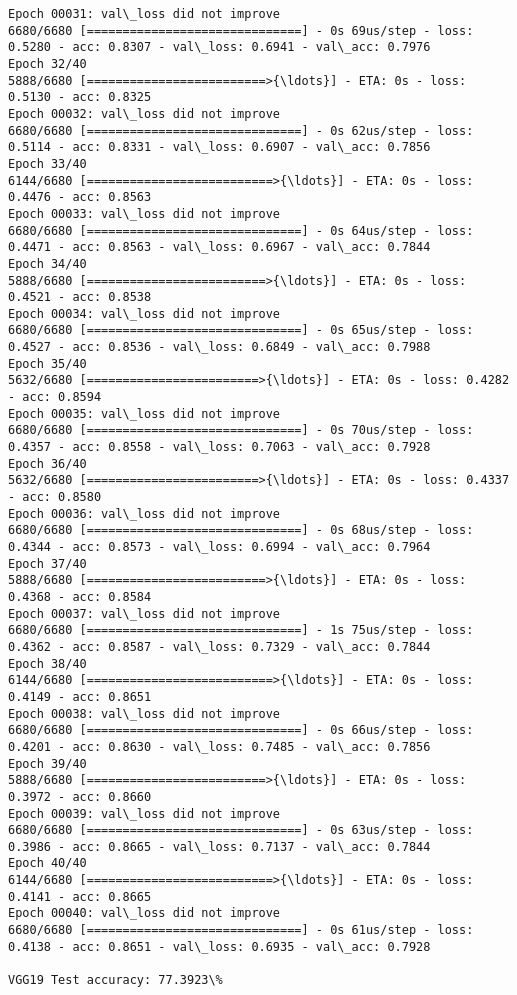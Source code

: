 \documentclass[11pt]{article}
\begin{document}
\begin{Verbatim}[commandchars=\\\{\}]
Epoch 00031: val\_loss did not improve
6680/6680 [==============================] - 0s 69us/step - loss: 0.5280 - acc: 0.8307 - val\_loss: 0.6941 - val\_acc: 0.7976
Epoch 32/40
5888/6680 [=========================>{\ldots}] - ETA: 0s - loss: 0.5130 - acc: 0.8325
Epoch 00032: val\_loss did not improve
6680/6680 [==============================] - 0s 62us/step - loss: 0.5114 - acc: 0.8331 - val\_loss: 0.6907 - val\_acc: 0.7856
Epoch 33/40
6144/6680 [==========================>{\ldots}] - ETA: 0s - loss: 0.4476 - acc: 0.8563
Epoch 00033: val\_loss did not improve
6680/6680 [==============================] - 0s 64us/step - loss: 0.4471 - acc: 0.8563 - val\_loss: 0.6967 - val\_acc: 0.7844
Epoch 34/40
5888/6680 [=========================>{\ldots}] - ETA: 0s - loss: 0.4521 - acc: 0.8538
Epoch 00034: val\_loss did not improve
6680/6680 [==============================] - 0s 65us/step - loss: 0.4527 - acc: 0.8536 - val\_loss: 0.6849 - val\_acc: 0.7988
Epoch 35/40
5632/6680 [========================>{\ldots}] - ETA: 0s - loss: 0.4282 - acc: 0.8594
Epoch 00035: val\_loss did not improve
6680/6680 [==============================] - 0s 70us/step - loss: 0.4357 - acc: 0.8558 - val\_loss: 0.7063 - val\_acc: 0.7928
Epoch 36/40
5632/6680 [========================>{\ldots}] - ETA: 0s - loss: 0.4337 - acc: 0.8580
Epoch 00036: val\_loss did not improve
6680/6680 [==============================] - 0s 68us/step - loss: 0.4344 - acc: 0.8573 - val\_loss: 0.6994 - val\_acc: 0.7964
Epoch 37/40
5888/6680 [=========================>{\ldots}] - ETA: 0s - loss: 0.4368 - acc: 0.8584
Epoch 00037: val\_loss did not improve
6680/6680 [==============================] - 1s 75us/step - loss: 0.4362 - acc: 0.8587 - val\_loss: 0.7329 - val\_acc: 0.7844
Epoch 38/40
6144/6680 [==========================>{\ldots}] - ETA: 0s - loss: 0.4149 - acc: 0.8651
Epoch 00038: val\_loss did not improve
6680/6680 [==============================] - 0s 66us/step - loss: 0.4201 - acc: 0.8630 - val\_loss: 0.7485 - val\_acc: 0.7856
Epoch 39/40
5888/6680 [=========================>{\ldots}] - ETA: 0s - loss: 0.3972 - acc: 0.8660
Epoch 00039: val\_loss did not improve
6680/6680 [==============================] - 0s 63us/step - loss: 0.3986 - acc: 0.8665 - val\_loss: 0.7137 - val\_acc: 0.7844
Epoch 40/40
6144/6680 [==========================>{\ldots}] - ETA: 0s - loss: 0.4141 - acc: 0.8665
Epoch 00040: val\_loss did not improve
6680/6680 [==============================] - 0s 61us/step - loss: 0.4138 - acc: 0.8651 - val\_loss: 0.6935 - val\_acc: 0.7928

VGG19 Test accuracy: 77.3923\%

    \end{Verbatim}
\end{document}
